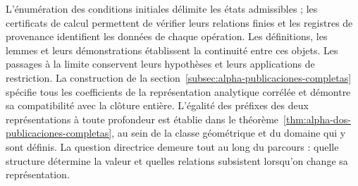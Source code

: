 L'énumération des conditions initiales délimite les états admissibles ;
les certificats de calcul permettent de vérifier leurs relations finies et
les registres de provenance identifient les données de chaque opération.
Les définitions, les lemmes et leurs démonstrations établissent la continuité
entre ces objets. Les passages à la limite conservent leurs hypothèses et leurs
applications de restriction.
La construction de la section~\ref{subsec:alpha-publicaciones-completas}
spécifie tous les coefficients de la représentation analytique corrélée
et démontre sa compatibilité avec la clôture entière. L'égalité des
préfixes des deux représentations à toute profondeur est établie dans le
théorème~\ref{thm:alpha-dos-publicaciones-completas}, au sein de la classe
géométrique et du domaine qui y sont définis.
La question directrice demeure tout au long
du parcours : quelle structure détermine la valeur et quelles relations subsistent
lorsqu'on change sa représentation.
